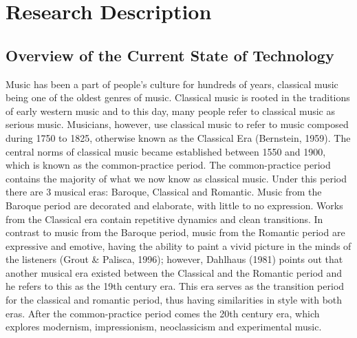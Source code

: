 %
%
%                 

\chapter{Research Description}
\label{sec:researchdesc}    %

\section{Overview of the Current State of Technology}
\label{sec:overview}
	Music has been a part of people’s culture for hundreds of years, classical music being one of the oldest genres of music. Classical music is rooted in the traditions of early western music and to this day, many people refer to classical music as serious music. Musicians, however, use classical music to refer to music composed during 1750 to 1825, otherwise known as the Classical Era (Bernstein, 1959). The central norms of classical music became established between 1550 and 1900, which is known as the common-practice period. The common-practice period contains the majority of what we now know as classical music. Under this period there are 3 musical eras: Baroque, Classical and Romantic. Music from the Baroque period are decorated and elaborate, with little to no expression. Works from the Classical era contain repetitive dynamics and clean transitions. In contrast to music from the Baroque period, music from the Romantic period are expressive and emotive, having the ability to paint a vivid picture in the minds of the listeners (Grout \& Palisca, 1996); however, Dahlhaus (1981) points out that another musical era existed between the Classical and the Romantic period and he refers to this as the 19th century era. This era serves as the transition period for the classical and romantic period, thus having similarities in style with both eras. After the common-practice period comes the 20th century era, which explores modernism, impressionism, neoclassicism and experimental music. 

